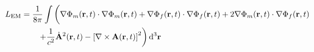 \documentclass{article}
\begin{document}
\begin{equation}
\begin{split}
L_\mathrm{EM} &= \frac{1}{8\pi}\int\left( \vphantom{\frac{1}{c^2}} \nabla\Phi_m(\mathbf{r},t)\cdot\nabla\Phi_m(\mathbf{r},t) + \nabla\Phi_f(\mathbf{r},t)\cdot\nabla\Phi_f(\mathbf{r},t) + 2\nabla\Phi_m(\mathbf{r},t)\cdot\nabla\Phi_f(\mathbf{r},t)\right.\\
&\qquad\left. + \frac{1}{c^2}\dot{\mathbf{A}}^2(\mathbf{r},t) - \left[\nabla\times\mathbf{A}(\mathbf{r},t)\right]^2\right)\mathrm{d}^3\mathbf{r}\\

\end{split}
\end{equation}
\end{document}
